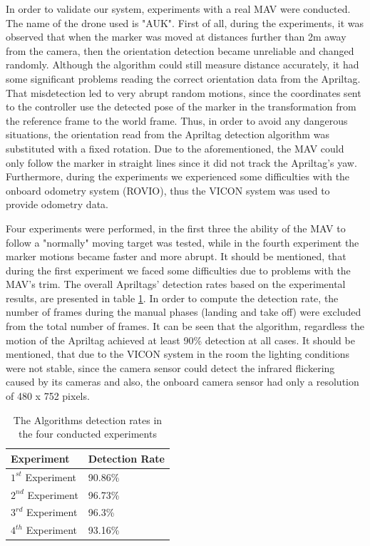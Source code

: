 In order to validate our system, experiments with a real MAV were conducted. The name of the drone used is "AUK". First of all, during the experiments, it was observed that when the marker was moved at distances further than 2m away from the camera, then the orientation detection became unreliable and changed randomly. Although the algorithm could still measure distance accurately, it had some significant problems reading the correct orientation data from the Apriltag. That misdetection led to very abrupt random motions, since the coordinates sent to the controller use the detected pose of the marker in the transformation from the reference frame to the world frame. Thus, in order to avoid any dangerous situations, the orientation read from the Apriltag detection algorithm was substituted with a fixed rotation. Due to the aforementioned, the MAV could only follow the marker in straight lines since it did not track the Apriltag's yaw. Furthermore, during the experiments we experienced some difficulties with the onboard odometry system (ROVIO\protect\footnotemark), thus the VICON system was used to provide odometry data.


Four experiments were performed, in the first three the ability of the MAV to follow a "normally" moving target was tested, while in the fourth experiment the marker motions became faster and more abrupt. It should be mentioned, that during the first experiment we faced some difficulties due to problems with the MAV's trim. The overall Apriltags' detection rates based on the experimental results, are presented in table \ref{table:detctionRates}. In order to compute the detection rate, the number of frames during the manual phases (landing and take off) were excluded from the total number of frames. It can be seen that the algorithm, regardless the motion of the Apriltag achieved at least 90\% detection at all cases. It should be mentioned, that due to the VICON system in the room the lighting conditions were not stable, since the camera sensor could detect the infrared flickering caused by its cameras and also, the onboard camera sensor had only a resolution of 480 x 752 pixels.

\begin{table}
\begin{center}
    \begin{tabular}{ | l | l |}
    \hline
    Experiment & Detection Rate \\ \hline
    $1^{st}$ Experiment & 90.86\% \\ \hline
    $2^{nd}$ Experiment & 96.73\% \\ \hline
    $3^{rd}$ Experiment & 96.3\% \\ \hline
    $4^{th}$ Experiment & 93.16\% \\ \hline
    \end{tabular}
    \caption{The Algorithms detection rates in the four conducted experiments}
    \label{table:detctionRates}
\end{center}
\end{table}

